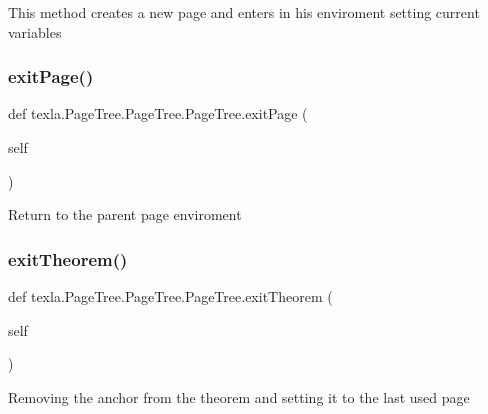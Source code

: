\begin{DoxyVerb}This method creates a new page and enters
in his enviroment setting current variables\end{DoxyVerb}
 \hypertarget{classtexla_1_1PageTree_1_1PageTree_1_1PageTree_adfd53d92c57eefb5d956cc1c3e646373}{}\label{classtexla_1_1PageTree_1_1PageTree_1_1PageTree_adfd53d92c57eefb5d956cc1c3e646373} 
\subsubsection{\texorpdfstring{exit\+Page()}{exitPage()}}
{\footnotesize\ttfamily def texla.\+Page\+Tree.\+Page\+Tree.\+Page\+Tree.\+exit\+Page (\begin{DoxyParamCaption}\item[{}]{self }\end{DoxyParamCaption})}

\begin{DoxyVerb}Return to the parent page enviroment\end{DoxyVerb}
 \hypertarget{classtexla_1_1PageTree_1_1PageTree_1_1PageTree_a6f720d497af55d8ccdeadb779d6a61bc}{}\label{classtexla_1_1PageTree_1_1PageTree_1_1PageTree_a6f720d497af55d8ccdeadb779d6a61bc} 
\subsubsection{\texorpdfstring{exit\+Theorem()}{exitTheorem()}}
{\footnotesize\ttfamily def texla.\+Page\+Tree.\+Page\+Tree.\+Page\+Tree.\+exit\+Theorem (\begin{DoxyParamCaption}\item[{}]{self }\end{DoxyParamCaption})}

\begin{DoxyVerb}Removing the anchor from the theorem and setting it
to the last used page\end{DoxyVerb}
 \hypertarget{classtexla_1_1PageTree_1_1PageTree_1_1PageTree_adfebbe59a30cbde4040c5065c867107f}{}\label{classtexla_1_1PageTree_1_1PageTree_1_1PageTree_adfebbe59a30cbde4040c5065c867107f} 
